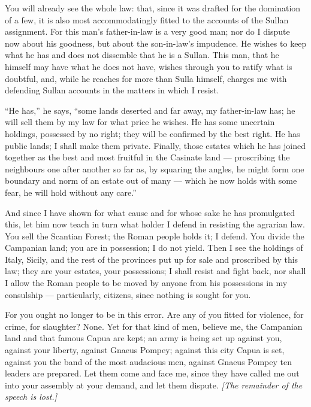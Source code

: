  You will already see the whole law: that, since it was drafted for the domination of a few, it is also most accommodatingly fitted to the accounts of the Sullan assignment. For this man's father-in-law is a very good man; nor do I dispute now about his goodness, but about the son-in-law's impudence. He wishes to keep what he has and does not dissemble that he is a Sullan. This man, that he himself may have what he does not have, wishes through you to ratify what is doubtful, and, while he reaches for more than Sulla himself, charges me with defending Sullan accounts in the matters in which I resist.

 ``He has,'' he says, ``some lands deserted and far away, my father-in-law has; he will sell them by my law for what price he wishes. He has some uncertain holdings, possessed by no right; they will be confirmed by the best right. He has public lands; I shall make them private. Finally, those estates which he has joined together as the best and most fruitful in the Casinate land --- proscribing the neighbours one after another so far as, by squaring the angles, he might form one boundary and norm of an estate out of many --- which he now holds with some fear, he will hold without any care.''

 And since I have shown for what cause and for whose sake he has promulgated this, let him now teach in turn what holder I defend in resisting the agrarian law. You sell the Scantian Forest; the Roman people holds it; I defend. You divide the Campanian land; you are in possession; I do not yield. Then I see the holdings of Italy, Sicily, and the rest of the provinces put up for sale and proscribed by this law; they are your estates, your possessions; I shall resist and fight back, nor shall I allow the Roman people to be moved by anyone from his possessions in my consulship --- particularly, citizens, since nothing is sought for you.

 For you ought no longer to be in this error. Are any of you fitted for violence, for crime, for slaughter? None. Yet for that kind of men, believe me, the Campanian land and that famous Capua are kept; an army is being set up against you, against your liberty, against Gnaeus Pompey; against this city Capua is set, against you the band of the most audacious men, against Gnaeus Pompey ten leaders are prepared. Let them come and face me, since they have called me out into your assembly at your demand, and let them dispute. \textit{[The remainder of the speech is lost.]}
